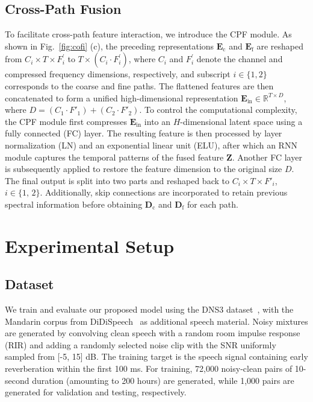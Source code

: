 \documentclass[journal]{IEEEtran}
\begin{document}
\subsection{Cross-Path Fusion}
\label{cpf}
To facilitate cross-path feature interaction, we introduce the CPF module.
As shown in Fig.~\ref{fig:cofi} (c), the preceding representations $\mathbf{E}_{\text{c}}$ and $\mathbf{E}_{\text{f}}$ are reshaped from $C_i \times T \times F^{\prime}_i$ to $T \times (C_i \cdot F^{\prime}_i)$, where $C_i$ and $F^{\prime}_i$ denote the channel and compressed frequency dimensions, respectively, and subscript $i \in \{1, 2\}$ corresponds to the coarse and fine paths. 
The flattened features are then concatenated to form a unified high-dimensional representation $\mathbf{E}_{\text{in}} \in \mathbb{R}^{T \times D}$, where $D = (C_{\text{1}} \cdot F'_{\text{1}}) + (C_{\text{2}} \cdot F'_{\text{2}})$.
To control the computational complexity, the CPF module first compresses $\mathbf{E}_{\text{in}}$ into an $H$-dimensional latent space using a fully connected (FC) layer.
The resulting feature is then processed by layer normalization (LN) and an exponential linear unit (ELU), after which an RNN module captures the temporal patterns of the fused feature $\mathbf{Z}$. Another FC layer is subsequently applied to restore the feature dimension to the original size $D$. 
The final output is split into two parts and reshaped back to $C_i \times T \times F'_i$, $i \in \{\text{1, 2}\}$.
Additionally, skip connections are incorporated to retain previous spectral information before obtaining $\mathbf{D}_{\text{c}}$ and $\mathbf{D}_{\text{f}}$ for each path.

\section{Experimental Setup}

\subsection{Dataset}
We train and evaluate our proposed model using the DNS3 dataset~\cite{dns3}, with the Mandarin corpus from DiDiSpeech~\cite{didispeech} as additional speech material. 
Noisy mixtures are generated by convolving clean speech with a random room impulse response (RIR) and adding a randomly selected noise clip with the SNR uniformly sampled from [-5, 15] dB.
The training target is the speech signal containing early reverberation within the first 100 ms.
For training, 72,000 noisy-clean pairs of 10-second duration (amounting to 200 hours) are generated, while 1,000 pairs are generated for validation and testing, respectively.
\end{document}
